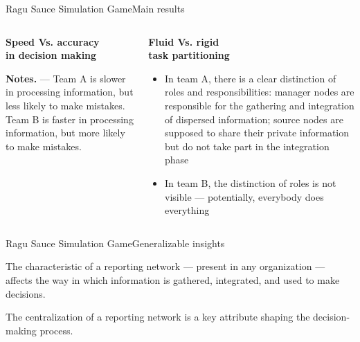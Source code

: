 \documentclass[notes, aspectratio=1610]{beamer}
\begin{document}
\begin{frame}{Ragu Sauce Simulation Game}{Main results}
	\begin{columns}[t]
		\begin{column}{0.5\textwidth}
			\begin{center}
				\textbf{Speed Vs. accuracy \\in decision making}

				

			\end{center}

			\scriptsize \textbf{Notes.} --- Team A is slower in 
			processing information, but less likely to make mistakes. 
			Team B is faster in processing information, but more 
			likely to make mistakes.
		\end{column}
		\begin{column}{0.5\textwidth}
			\begin{center}
				\textbf{Fluid Vs. rigid \\task partitioning}

				\begin{itemize}
					\item In team A, there is a clear 
					distinction of roles and responsibilities:
					manager nodes are responsible for the 
					gathering and integration of dispersed 
					information; source nodes are 
					supposed to share their private information 
					but do not take part in the integration phase
					\item In team B, the distinction of roles 
					is not visible --- potentially, everybody 
					does everything
				\end{itemize}
			\end{center}
		\end{column}
	\end{columns}
\end{frame}

\begin{frame}{Ragu Sauce Simulation Game}{Generalizable insights}
	\begin{tcolorbox}[
		colback=tri_1!5!white,
		colframe=tri_1!90!black,
		title={\centering \small Proposition 3}]
		The characteristic of a reporting network --- present in any 
		organization --- affects the way in which information is 
		gathered, integrated, and used to make decisions.
	\end{tcolorbox}

	\pause

	\begin{tcolorbox}[
		colback=tri_2!5!white,
		colframe=tri_2!90!black,
		title={\centering \small Corollario to Proposition 3}]
		The centralization of a reporting network is a key attribute 
		shaping the decision-making process.
	\end{tcolorbox}
\end{frame}
\end{document}
